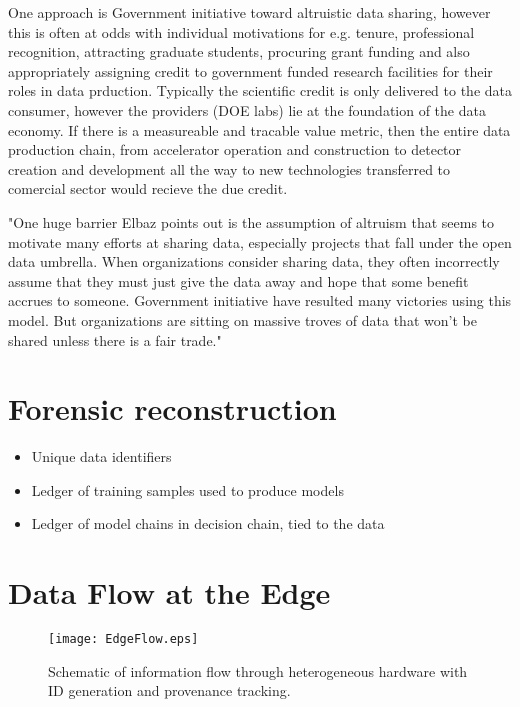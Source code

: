 \documentclass{article}
\begin{document}
One approach is Government initiative toward altruistic data sharing, however this is often at odds with individual motivations for e.g. tenure, professional recognition, attracting graduate students, procuring grant funding and also appropriately assigning credit to government funded research facilities for their roles in data prduction.  Typically the scientific credit is only delivered to the data consumer, however the providers (DOE labs) lie at the foundation of the data economy.
If there is a measureable and tracable value metric, then the entire data production chain, from accelerator operation and construction to detector creation and development all the way to new technologies transferred to comercial sector would recieve the due credit.

"One huge barrier Elbaz points out is the assumption of altruism that seems to motivate many
efforts at sharing data, especially projects that fall under the open data umbrella. When
organizations consider sharing data, they often incorrectly assume that they must just give the
data away and hope that some benefit accrues to someone. Government initiative have resulted
many victories using this model. But organizations are sitting on massive troves of data that
won’t be shared unless there is a fair trade."


\section{Forensic reconstruction}
\begin{itemize}
\item Unique data identifiers
\item Ledger of training samples used to produce models
\item Ledger of model chains in decision chain, tied to the data
\end{itemize}

\section{Data Flow at the Edge}
\begin{figure}
	\centerline{\texttt{[image: EdgeFlow.eps]}}
	\caption{
		\label{fig::EdgeFlow}
		Schematic of information flow through heterogeneous hardware with ID generation and provenance tracking.
		}
\end{figure}


\end{document}
